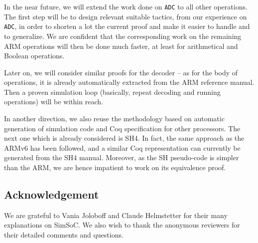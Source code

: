 In the near future, we will extend the work done on \texttt{ADC} 
to all other operations. 
The first step will be to design relevant suitable tactics,
from our experience on \texttt{ADC}, 
in order to shorten a lot the current proof and make it easier
to handle and to generalize.
We are confident that the corresponding work on 
the remaining ARM operations will then be done much faster,
at least for arithmetical and Boolean operations.

Later on, we will consider similar proofs for the decoder
-- as for the body of operations, it is already automatically
extracted from the ARM reference manual.
Then a proven simulation loop (basically, repeat decoding
and running operations) will be within reach.

In another direction, we also reuse the methodology based on
automatic generation of simulation code and Coq specification
for other processors. 
The next one which is already considered is SH4. 
In fact, the same approach as the ARMv6 has been followed, and a
similar Coq representation can currently be generated from the SH4
manual. Moreover, as the SH pseudo-code is simpler than the ARM, we are
hence impatient to work on its equivalence proof.


\subsection*{Acknowledgement}
We are grateful to Vania Joloboff and Claude Helmstetter for
their many explanations on SimSoC.
We also wish to thank the anonymous reviewers for their
detailed comments and questions. 

